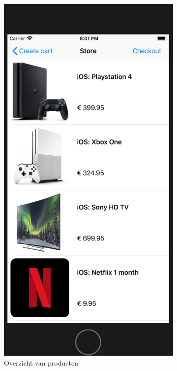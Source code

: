 \begin{figure}[H]
\begin{subfigure}{.5\textwidth}
		\includegraphics[width=0.65\linewidth]{img/poc/ios/2.png}
		\caption{Overzicht van producten}
		\label{fig:sub2}
	\end{subfigure}
	\begin{subfigure}{.5\textwidth}
		\centering

\end{subfigure}
\end{figure}
